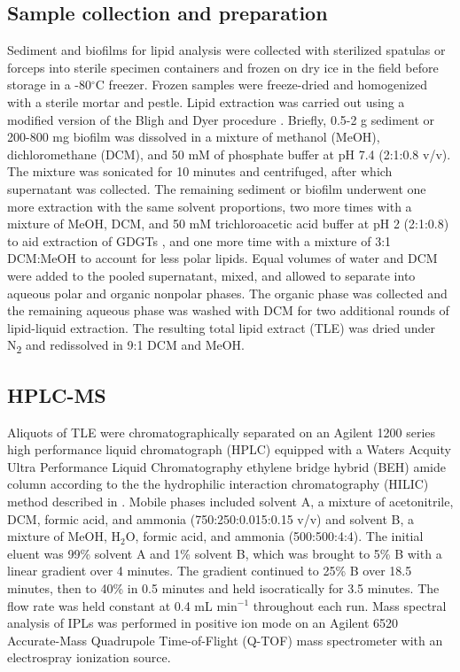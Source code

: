 \subsection{Sample collection and preparation} Sediment and biofilms for lipid analysis were collected with sterilized spatulas or forceps into sterile specimen containers and frozen on dry ice in the field before storage in a -80$^{\circ}$C freezer. Frozen samples were freeze-dried and homogenized with a sterile mortar and pestle. Lipid extraction was carried out using a modified version of the Bligh and Dyer procedure \citep{white1998signature}. Briefly, 0.5-2 g sediment or 200-800 mg biofilm was dissolved in a mixture of methanol (MeOH), dichloromethane (DCM), and 50 mM of phosphate buffer at pH 7.4 (2:1:0.8 v/v). The mixture was sonicated for 10 minutes and centrifuged, after which supernatant was collected. The remaining sediment or biofilm underwent one more extraction with the same solvent proportions, two more times with a mixture of MeOH, DCM, and 50 mM trichloroacetic acid buffer at pH 2 (2:1:0.8) to aid extraction of GDGTs \citep{nishihara1987extraction}, and one more time with a mixture of 3:1 DCM:MeOH to account for less polar lipids. Equal volumes of water and DCM were added to the pooled supernatant, mixed, and allowed to separate into aqueous polar and organic nonpolar phases. The organic phase was collected and the remaining aqueous phase was washed with DCM for two additional rounds of lipid-liquid extraction. The resulting total lipid extract (TLE) was dried under N\textsubscript{2} and redissolved in 9:1 DCM and MeOH.

\subsection{HPLC-MS} Aliquots of TLE were chromatographically separated on an Agilent 1200 series high performance liquid chromatograph (HPLC) equipped with a Waters Acquity Ultra Performance Liquid Chromatography ethylene bridge hybrid (BEH) amide column according to the the hydrophilic interaction chromatography (HILIC) method described in \cite{Wrmer_Application_2013}. Mobile phases included solvent A, a mixture of acetonitrile, DCM, formic acid, and ammonia (750:250:0.015:0.15 v/v) and solvent B, a mixture of MeOH, H$_{2}$O, formic acid, and ammonia (500:500:4:4). The initial eluent was 99\% solvent A and 1\% solvent B, which was brought to 5\% B with a linear gradient over 4 minutes. The gradient continued to 25\% B over 18.5 minutes, then to 40\% in 0.5 minutes and held isocratically for 3.5 minutes. The flow rate was held constant at 0.4 mL min$^{-1}$ throughout each run. Mass spectral analysis of IPLs was performed in positive ion mode on an Agilent 6520 Accurate-Mass Quadrupole Time-of-Flight (Q-TOF) mass spectrometer with an electrospray ionization source.

